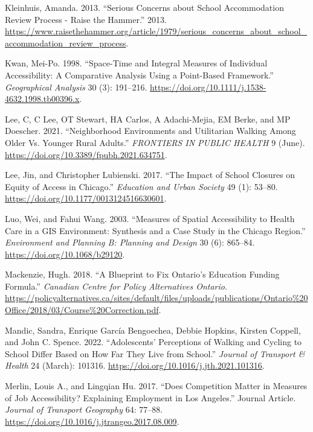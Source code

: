 \documentclass[
default
]{sn-jnl}
\newlength{\cslhangindent}
\newenvironment{CSLReferences}[2] %
 {\begin{list}{}{%
  \setlength{\itemindent}{0pt}
  \setlength{\leftmargin}{0pt}
  \setlength{\parsep}{0pt}
  \ifodd #1
   \setlength{\leftmargin}{\cslhangindent}
   \setlength{\itemindent}{-1\cslhangindent}
  \fi
  \setlength{\itemsep}{#2\baselineskip}}}
 {\end{list}}
\begin{document}
\begin{CSLReferences}{1}{0}
Kleinhuis, Amanda. 2013. {``Serious Concerns about School Accommodation
Review Process - Raise the Hammer.''} 2013.
\url{https://www.raisethehammer.org/article/1979/serious_concerns_about_school_accommodation_review_process}.

Kwan, Mei-Po. 1998. {``Space-Time and Integral Measures of Individual
Accessibility: A Comparative Analysis Using a Point-Based Framework.''}
\emph{Geographical Analysis} 30 (3): 191--216.
\url{https://doi.org/10.1111/j.1538-4632.1998.tb00396.x}.

Lee, C, C Lee, OT Stewart, HA Carlos, A Adachi-Mejia, EM Berke, and MP
Doescher. 2021. {``Neighborhood Environments and Utilitarian Walking
Among Older Vs. Younger Rural Adults.''} \emph{{FRONTIERS} {IN} {PUBLIC}
{HEALTH}} 9 (June). \url{https://doi.org/10.3389/fpubh.2021.634751}.

Lee, Jin, and Christopher Lubienski. 2017. {``The Impact of School
Closures on Equity of Access in Chicago.''} \emph{Education and Urban
Society} 49 (1): 53--80. \url{https://doi.org/10.1177/0013124516630601}.

Luo, Wei, and Fahui Wang. 2003. {``Measures of {Spatial Accessibility}
to {Health Care} in a {GIS Environment}: {Synthesis} and a {Case Study}
in the {Chicago Region}.''} \emph{Environment and Planning B: Planning
and Design} 30 (6): 865--84. \url{https://doi.org/10.1068/b29120}.

Mackenzie, Hugh. 2018. {``A Blueprint to Fix Ontario's Education Funding
Formula.''} \emph{Canadian Centre for Policy Alternatives {\textbar}
Ontario}.
\url{https://policyalternatives.ca/sites/default/files/uploads/publications/Ontario\%20Office/2018/03/Course\%20Correction.pdf}.

Mandic, Sandra, Enrique García Bengoechea, Debbie Hopkins, Kirsten
Coppell, and John C. Spence. 2022. {``Adolescents' Perceptions of
Walking and Cycling to School Differ Based on How Far They Live from
School.''} \emph{Journal of Transport \& Health} 24 (March): 101316.
\url{https://doi.org/10.1016/j.jth.2021.101316}.

Merlin, Louis A., and Lingqian Hu. 2017. {``Does Competition Matter in
Measures of Job Accessibility? Explaining Employment in Los Angeles.''}
Journal Article. \emph{Journal of Transport Geography} 64: 77--88.
\url{https://doi.org/10.1016/j.jtrangeo.2017.08.009}.


\end{CSLReferences}
\end{document}
